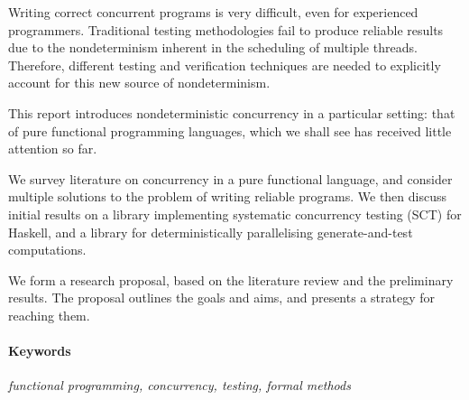 Writing correct concurrent programs is very difficult, even for
experienced programmers. Traditional testing methodologies fail to
produce reliable results due to the nondeterminism inherent in the
scheduling of multiple threads. Therefore, different testing and
verification techniques are needed to explicitly account for this new
source of nondeterminism.

This report introduces nondeterministic concurrency in a particular
setting: that of pure functional programming languages, which we shall
see has received little attention so far.

We survey literature on concurrency in a pure functional language, and
consider multiple solutions to the problem of writing reliable
programs. We then discuss initial results on a library implementing
systematic concurrency testing (SCT) for Haskell, and a library for
deterministically parallelising generate-and-test computations.

We form a research proposal, based on the literature review and the
preliminary results. The proposal outlines the goals and aims, and
presents a strategy for reaching them.

\vfill

\paragraph{Keywords}

\textit{functional programming, concurrency,
  testing, formal methods}